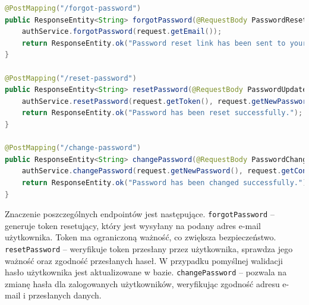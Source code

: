 \begin{lstlisting}[language=Java, style=JavaStyle, caption=Fragment klasy \texttt{AuthController}]
@PostMapping("/forgot-password")
public ResponseEntity<String> forgotPassword(@RequestBody PasswordResetRequest request) {
    authService.forgotPassword(request.getEmail());
    return ResponseEntity.ok("Password reset link has been sent to your email.");
}

@PostMapping("/reset-password")
public ResponseEntity<String> resetPassword(@RequestBody PasswordUpdateRequest request) {
    authService.resetPassword(request.getToken(), request.getNewPassword(), request.getConfirmPassword());
    return ResponseEntity.ok("Password has been reset successfully.");
}

@PostMapping("/change-password")
public ResponseEntity<String> changePassword(@RequestBody PasswordChangeRequest request) {
    authService.changePassword(request.getNewPassword(), request.getConfirmPassword(), request.getEmail());
    return ResponseEntity.ok("Password has been changed successfully.");
}
\end{lstlisting}

Znaczenie poszczególnych endpointów jest następujące.\newline
\texttt{forgotPassword} -- generuje token resetujący, który jest wysyłany na podany adres e-mail użytkownika. Token ma ograniczoną ważność, co zwiększa bezpieczeństwo.\newline
\texttt{resetPassword} -- weryfikuje token przesłany przez użytkownika, sprawdza jego ważność oraz zgodność przesłanych haseł. W przypadku pomyślnej walidacji hasło użytkownika jest aktualizowane w bazie.\newline
\texttt{changePassword} -- pozwala na zmianę hasła dla zalogowanych użytkowników, weryfikując zgodność adresu e-mail i przesłanych danych.


